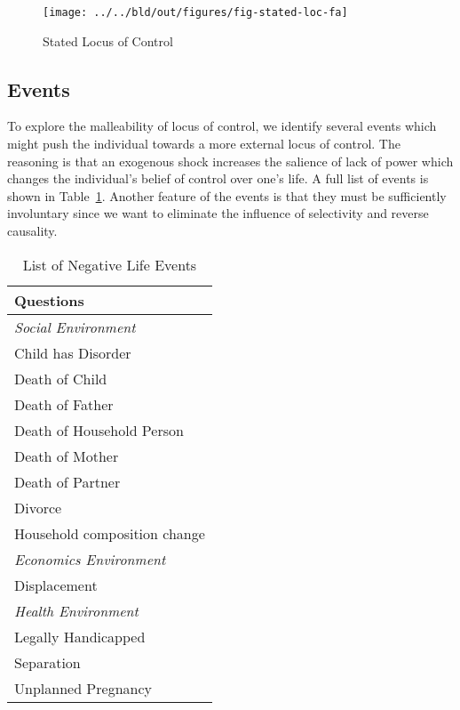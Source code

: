 \documentclass[12pt, a4paper, fleqn, parskip]{scrartcl}
\newcommand{\rowgroup}[1]{\hspace{-1em}#1}  %
\begin{document}
\begin{figure}[H]
	\centering
	\texttt{[image: ../../bld/out/figures/fig-stated-loc-fa]}
	\caption{Stated Locus of Control}
	\label{fig:stated_loc}
\end{figure}



\subsection{Events} %
\label{sub:events}

To explore the malleability of locus of control, we identify several events
which might push the individual towards a more external locus of control. The
reasoning is that an exogenous shock increases the salience of lack of power
which changes the individual's belief of control over one's life. A full list
of events is shown in Table~\ref{tab:negative_life_events}. Another feature of
the events is that they must be sufficiently involuntary since we want to
eliminate the influence of selectivity and reverse causality.

\begin{table}[H]
	\caption{List of Negative Life Events}
	\label{tab:negative_life_events}
	\centering

	\begin{tabular}{>{\quad}l}
	\toprule
	Questions\\
	\midrule
	\rule{0pt}{2.5ex}	\rowgroup{\textit{Social Environment}} \\
	Child has Disorder\\
	Death of Child\\
	Death of Father\\
	Death of Household Person\\
	Death of Mother\\
	Death of Partner\\
	Divorce\\
	Household composition change\\
	\rule{0pt}{2.5ex}	\rowgroup{\textit{Economics Environment}} \\
	Displacement\\
	\rule{0pt}{2.5ex}	\rowgroup{\textit{Health Environment}} \\
	Legally Handicapped\\
	Separation\\
	Unplanned Pregnancy\\
	\bottomrule
	\end{tabular}
\end{table}
\end{document}
